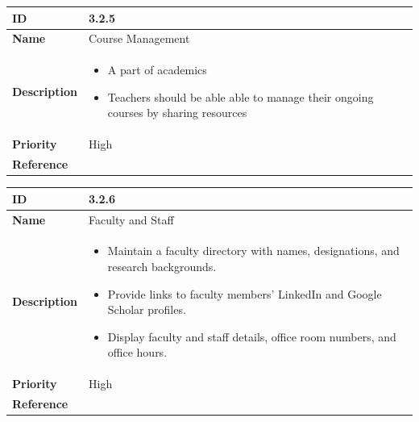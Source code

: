 \documentclass[11pt]{article}
\begin{document}
\begin{center}
  \begin{tabular}{ | >{\bfseries}m{5em} | m{10cm} |  } 
    \hline
    ID & 3.2.5\\  
    \hline
    Name & Course Management \\  
    \hline
    Description & 
    \begin{itemize}
      \item A part of academics
      \item Teachers should be able able to manage their ongoing courses by sharing resources
    \end{itemize} \\ 
    \hline
    Priority & High\\
    \hline 
    Reference & \\
    \hline
  \end{tabular}
  \end{center}
  
  \vspace{0.5cm}

\begin{center}
\begin{tabular}{ | >{\bfseries}m{5em} | m{10cm} |  } 
  \hline
  ID & 3.2.6\\  
  \hline
  Name & Faculty and Staff \\  
  \hline
  Description & 
  \begin{itemize}
      \item Maintain a faculty directory with names, designations, and research backgrounds.
      \item Provide links to faculty members' LinkedIn and Google Scholar profiles.
      \item Display faculty and staff details, office room numbers, and office hours.
  \end{itemize} \\ 
  \hline
  Priority & High\\
  \hline 
  Reference & \\
  \hline
\end{tabular}
\end{center}

\vspace{0.5cm}
\end{document}
